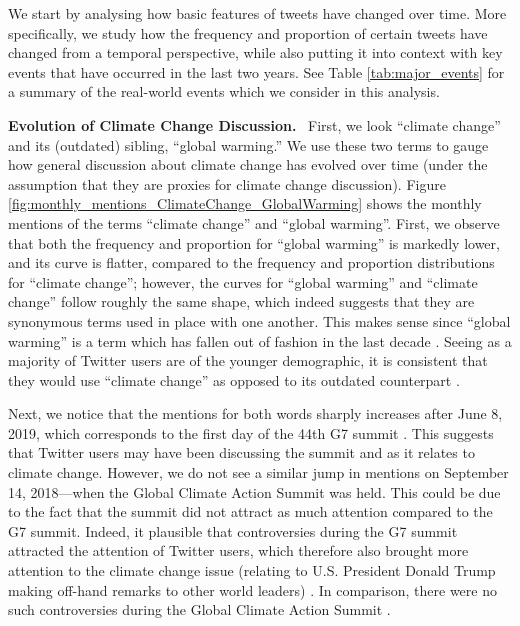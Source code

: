 \documentclass{paper}
\newcommand{\inlineSection}[1]{\vspace{0.5em}\noindent\textbf{#1.}~}
\begin{document}
We start by analysing how basic features of tweets have changed over time. More specifically, we study how the frequency and proportion of certain tweets have changed from a temporal perspective, while also putting it into context with key events that have occurred in the last two years. See Table \ref{tab:major_events} for a summary of the real-world events which we consider in this analysis.

\inlineSection{Evolution of Climate Change Discussion} First, we look ``climate change'' and its (outdated) sibling, ``global warming.'' We use these two terms to gauge how general discussion about climate change has evolved over time (under the assumption that they are proxies for climate change discussion). Figure \ref{fig:monthly_mentions_ClimateChange_GlobalWarming} shows the monthly mentions of the terms ``climate change'' and ``global warming''. First, we observe that both the frequency and proportion for ``global warming'' is markedly lower, and its curve is flatter, compared to the frequency and proportion distributions for ``climate change''; however, the curves for ``global warming'' and ``climate change'' follow roughly the same shape, which indeed suggests that they are synonymous terms used in place with one another. This makes sense since ``global warming'' is a term which has fallen out of fashion in the last decade \cite{nasa:climate_change_v_global_warming}. Seeing as a majority of Twitter users are of the younger demographic, it is consistent that they would use ``climate change'' as opposed to its outdated counterpart \cite{nasa:climate_change_v_global_warming}.

Next, we notice that the mentions for both words sharply increases after June 8, 2019, which corresponds to the first day of the 44th G7 summit \cite{wiki:g7_44}. This suggests that Twitter users may have been discussing the summit and as it relates to climate change. However, we do not see a similar jump in mentions on September 14, 2018---when the Global Climate Action Summit was held. This could be due to the fact that the summit did not attract as much attention compared to the G7 summit. Indeed, it plausible that controversies during the G7 summit attracted the attention of Twitter users, which therefore also brought more attention to the climate change issue (relating to U.S. President Donald Trump making off-hand remarks to other world leaders) \cite{wiki:g7_44}. In comparison, there were no such controversies during the Global Climate Action Summit \cite{un_climate_action_summit}.
\end{document}
